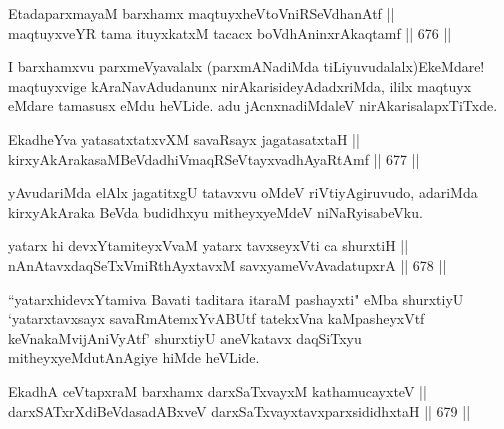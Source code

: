 
\begin{shl}
EtadaparxmayaM barxhamx maqtuyxheVtoVniRSeVdhanAtf || \\
maqtuyxveYR tama ituyxkatxM tacacx boVdhAninxrAkaqtamf \hfill || 676 ||  
\end{shl}

\begin{artha} 
I barxhamxvu parxmeVyavalalx (parxmANadiMda tiLiyuvudalalx)\break EkeMdare! maqtuyxvige kAraNavAdudanunx nirAkarisideyAdadxriMda, ililx maqtuyx eMdare tamasusx eMdu heVLide. adu jAcnxnadiMdaleV nirAkarisalapxTiTxde.
\end{artha}


\begin{shl}
EkadheYva yatasatxtatxvXM savaRsayx jagatasatxtaH || \\
kirxyAkArakasaMBeVdadhiVmaqRSeVtayxvadhAyaRtAmf \hfill || 677 ||  
\end{shl}

\begin{artha} 
yAvudariMda elAlx jagatitxgU tatavxvu oMdeV riVtiyAgiru\-\break vudo, adariMda 
kirxyAkAraka BeVda budidhxyu mitheyxyeMdeV niNaRyisabeVku.
\end{artha}


\begin{shl}
yatarx hi devxYtamiteyxVvaM yatarx tavxseyxVti ca shurxtiH || \\
nAnAtavxdaqSeTxVmiRthAyxtavxM savxyameVvAvadatupxrA \hfill || 678 ||  
\end{shl}

\begin{artha} 
``yatarxhidevxYtamiva Bavati taditara itaraM pashayxti" eMba shurxtiyU `yatarxtavxsayx savaRmAtemxYvABUtf tatekxVna kaMpasheyxVtf keVnakaM\break vijAniVyAtf' shurxtiyU aneVkatavx daqSiTxyu mitheyxyeMdu\break tAnAgiye hiMde heVLide.
\end{artha}


\begin{shl}
EkadhA ceVtapxraM barxhamx darxSaTxvayxM kathamucayxteV || \\
darxSATxrXdiBeVdasadABxveV darxSaTxvayxtavxparxsididhxtaH \hfill || 679 ||  
\end{shl}


